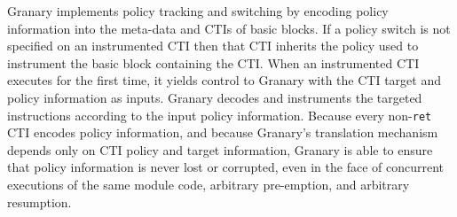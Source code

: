 \documentclass[preprint]{sigplanconf}
\begin{document}


Granary implements policy tracking and switching by encoding policy information into the meta-data and CTIs of basic blocks. If a policy switch is not specified on an instrumented CTI then that CTI inherits the policy used to instrument the basic block containing the CTI. When an instrumented CTI executes for the first time, it yields control to Granary with the CTI target and policy information as inputs. Granary decodes and instruments the targeted instructions according to the input policy information. Because every non-\texttt{ret} CTI encodes policy information, and because Granary's translation mechanism depends only on CTI policy and target information, Granary is able to ensure that policy information is never lost or corrupted, even in the face of concurrent executions of the same module code, arbitrary pre-emption, and arbitrary resumption.


\end{document}
